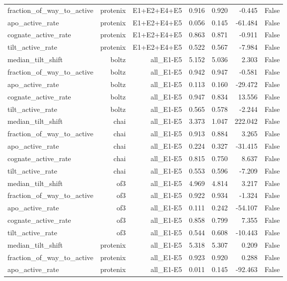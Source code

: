 \begin{table}[htbp]
\begin{tabular}{lrrrrrr}
fraction\_of\_way\_to\_active & protenix & E1+E2+E4+E5 & 0.916 & 0.920 & -0.445 & False \\
apo\_active\_rate & protenix & E1+E2+E4+E5 & 0.056 & 0.145 & -61.484 & False \\
cognate\_active\_rate & protenix & E1+E2+E4+E5 & 0.863 & 0.871 & -0.911 & False \\
tilt\_active\_rate & protenix & E1+E2+E4+E5 & 0.522 & 0.567 & -7.984 & False \\
median\_tilt\_shift & boltz & all\_E1-E5 & 5.152 & 5.036 & 2.303 & False \\
fraction\_of\_way\_to\_active & boltz & all\_E1-E5 & 0.942 & 0.947 & -0.581 & False \\
apo\_active\_rate & boltz & all\_E1-E5 & 0.113 & 0.160 & -29.472 & False \\
cognate\_active\_rate & boltz & all\_E1-E5 & 0.947 & 0.834 & 13.556 & False \\
tilt\_active\_rate & boltz & all\_E1-E5 & 0.565 & 0.578 & -2.244 & False \\
median\_tilt\_shift & chai & all\_E1-E5 & 3.373 & 1.047 & 222.042 & False \\
fraction\_of\_way\_to\_active & chai & all\_E1-E5 & 0.913 & 0.884 & 3.265 & False \\
apo\_active\_rate & chai & all\_E1-E5 & 0.224 & 0.327 & -31.415 & False \\
cognate\_active\_rate & chai & all\_E1-E5 & 0.815 & 0.750 & 8.637 & False \\
tilt\_active\_rate & chai & all\_E1-E5 & 0.553 & 0.596 & -7.209 & False \\
median\_tilt\_shift & of3 & all\_E1-E5 & 4.969 & 4.814 & 3.217 & False \\
fraction\_of\_way\_to\_active & of3 & all\_E1-E5 & 0.922 & 0.934 & -1.324 & False \\
apo\_active\_rate & of3 & all\_E1-E5 & 0.111 & 0.242 & -54.107 & False \\
cognate\_active\_rate & of3 & all\_E1-E5 & 0.858 & 0.799 & 7.355 & False \\
tilt\_active\_rate & of3 & all\_E1-E5 & 0.544 & 0.608 & -10.443 & False \\
median\_tilt\_shift & protenix & all\_E1-E5 & 5.318 & 5.307 & 0.209 & False \\
fraction\_of\_way\_to\_active & protenix & all\_E1-E5 & 0.923 & 0.920 & 0.288 & False \\
apo\_active\_rate & protenix & all\_E1-E5 & 0.011 & 0.145 & -92.463 & False \\

\end{tabular}
\end{table}
